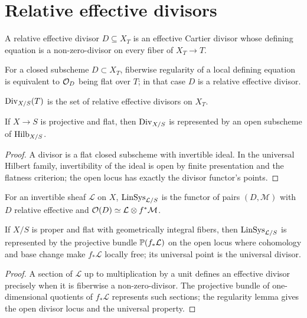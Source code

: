 \section{Relative effective divisors}
\begin{definition}\label{fga-def-9-3-3}\uses{}
A relative effective divisor $D\subseteq X_T$ is an effective Cartier divisor
whose defining equation is a non-zero-divisor on every fiber of $X_T\to T$.
\end{definition}\begin{lemma}\label{fga-lem-9-3-4}
For a closed subscheme $D\subset X_T$, fiberwise regularity of a local defining
equation is equivalent to $\mathcal O_D$ being flat over $T$; in that case $D$ is a
relative effective divisor.
\end{lemma}
\begin{definition}\label{fga-def-9-3-6}
$\operatorname{Div}_{X/S}(T)$ is the set of relative effective divisors on $X_T$.
\end{definition}
\begin{theorem}\label{fga-thm-9-3-7}
If $X\to S$ is projective and flat, then $\operatorname{Div}_{X/S}$ is represented by an
open subscheme of $\operatorname{Hilb}_{X/S}$.
\end{theorem}
\begin{proof}
A divisor is a flat closed subscheme with invertible ideal.  In the universal
Hilbert family, invertibility of the ideal is open by finite presentation and
the flatness criterion; the open locus has exactly the divisor functor's
points.
\end{proof}
\begin{definition}\label{fga-def-9-3-12}
For an invertible sheaf $\mathcal L$ on $X$, $\operatorname{LinSys}_{\mathcal L/S}$ is the
functor of pairs $(D,\mathcal M)$ with $D$ relative effective and
$\mathcal O(D)\simeq\mathcal L\otimes f^*\mathcal M$.
\end{definition}
\begin{theorem}\label{fga-thm-9-3-13}
If $X/S$ is proper and flat with geometrically integral fibers, then
$\operatorname{LinSys}_{\mathcal L/S}$ is represented by the projective bundle
$\mathbb P(f_*\mathcal L)$ on the open locus where cohomology and base change make
$f_*\mathcal L$ locally free; its universal point is the universal divisor.
\end{theorem}
\begin{proof}
A section of $\mathcal L$ up to multiplication by a unit defines an effective
divisor precisely when it is fiberwise a non-zero-divisor.  The projective
bundle of one-dimensional quotients of $f_*\mathcal L$ represents such sections;
the regularity lemma gives the open divisor locus and the universal property.
\end{proof}

